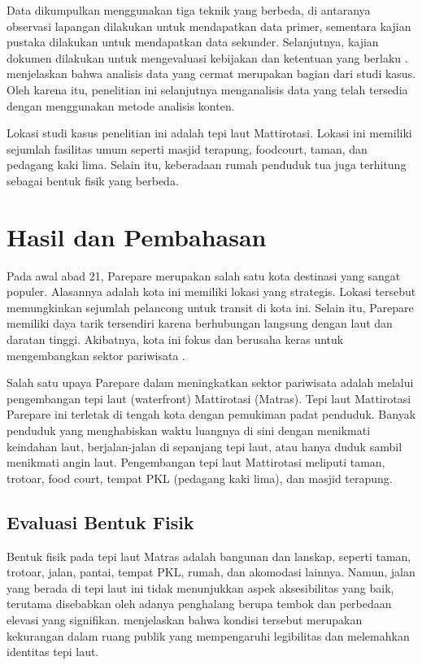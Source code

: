 \documentclass[11pt]{simart} %
\begin{document}
Data dikumpulkan menggunakan tiga teknik yang berbeda, di antaranya observasi lapangan dilakukan untuk mendapatkan data primer, sementara kajian pustaka dilakukan untuk mendapatkan data sekunder. Selanjutnya, kajian dokumen dilakukan untuk mengevaluasi kebijakan dan ketentuan yang berlaku \citep{iqbal2020}. \cite{wiraguna2024} menjelaskan bahwa analisis data yang cermat merupakan bagian dari studi kasus. Oleh karena itu, penelitian ini selanjutnya menganalisis data yang telah tersedia dengan menggunakan metode analisis konten.

Lokasi studi kasus penelitian ini adalah tepi laut Mattirotasi. Lokasi ini memiliki sejumlah fasilitas umum seperti masjid terapung, foodcourt, taman, dan pedagang kaki lima. Selain itu, keberadaan rumah penduduk tua juga terhitung sebagai bentuk fisik yang berbeda.

\section{Hasil dan Pembahasan}%

Pada awal abad 21, Parepare merupakan salah satu kota destinasi yang sangat populer. Alasannya adalah kota ini memiliki lokasi yang strategis. Lokasi tersebut memungkinkan sejumlah pelancong untuk transit di kota ini. Selain itu, Parepare memiliki daya tarik tersendiri karena berhubungan langsung dengan laut dan daratan tinggi. Akibatnya, kota ini fokus dan berusaha keras untuk mengembangkan sektor pariwisata \citep{faniapriani2018}.

Salah satu upaya Parepare dalam meningkatkan sektor pariwisata adalah melalui pengembangan tepi laut (waterfront) Mattirotasi (Matras). Tepi laut Mattirotasi Parepare ini terletak di tengah kota dengan pemukiman padat penduduk. Banyak penduduk yang menghabiskan waktu luangnya di sini dengan menikmati keindahan laut, berjalan-jalan di sepanjang tepi laut, atau hanya duduk sambil menikmati angin laut. Pengembangan tepi laut Mattirotasi meliputi taman, trotoar, food court, tempat PKL (pedagang kaki lima), dan masjid terapung.

\subsection{Evaluasi Bentuk Fisik}%
\label{sub:Evaluasi Bentuk Fisik}

Bentuk fisik pada tepi laut Matras adalah bangunan dan lanskap, seperti taman, trotoar, jalan, pantai, tempat PKL, rumah, dan akomodasi lainnya. Namun, jalan yang berada di tepi laut ini tidak menunjukkan aspek aksesibilitas yang baik, terutama disebabkan oleh adanya penghalang berupa tembok dan perbedaan elevasi yang signifikan. \cite{iqbal2020} menjelaskan bahwa kondisi tersebut merupakan kekurangan dalam ruang publik yang mempengaruhi legibilitas dan melemahkan identitas tepi laut.
\end{document}
